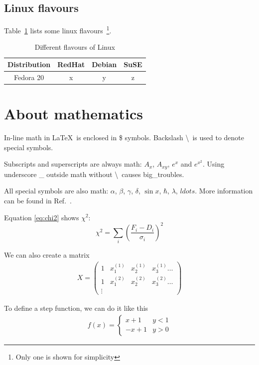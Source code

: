 \documentclass[a4paper,12pt,twoside]{article}
\begin{document}
\subsection{Linux flavours}
Table~\ref{tab:flavours} lists some linux flavours~\footnote{Only one is shown for simplicity}.
\begin{table}[ht]\label{tab:flavours}
 \begin{center}
  \begin{tabular}{c||c|c|c}
   \hline
   \textbf{Distribution}&RedHat&Debian&SuSE\\ \hline\hline
   Fedora 20            & x    & y    & z  \\ \hline
  \end{tabular}
  \caption{Different flavours of Linux}
 \end{center}
\end{table}

\section{About mathematics}\label{sec:math}

In-line math in \LaTeX \ is enclosed in \$ symbols. Backslash \textbackslash \ is used to denote special symbols.

Subscripts and superscripts are always math: $A_x$, $A_{xy}$, $e^x$ and $e^{x^2}$. Using underscore \_ outside math without \textbackslash \ causes big\_troubles. 

All special symbols are also math: $\alpha$, $\beta$, $\gamma$, $\delta$, $\sin x$, $\hbar$, $\lambda$, $ldots$. More information can be found in Ref.~\cite{latex}.

Equation \ref{eq:chi2} shows $\chi^2$:
\begin{equation}\label{eq:chi2}
 \chi^2=\sum\limits_i \left(\frac{F_i-D_i}{\sigma_i}\right)^2
\end{equation}

We can also create a matrix
\begin{align}
 X = \begin{pmatrix}
     1 & x_1^{(1)} & x_2^{(1)}  & x_3^{(1)} \dots \\
     1 & x_1^{(2)} & x_2^{(2)}  & x_3^{(2)} \dots \\
     \vdots 
     \end{pmatrix}
\end{align}

To define a step function, we can do it like this
\begin{align}
 f(x)=\begin{cases}
       x+1  & y < 1
       \\
       -x+1 & y > 0
      \end{cases}
\end{align}
\end{document}
